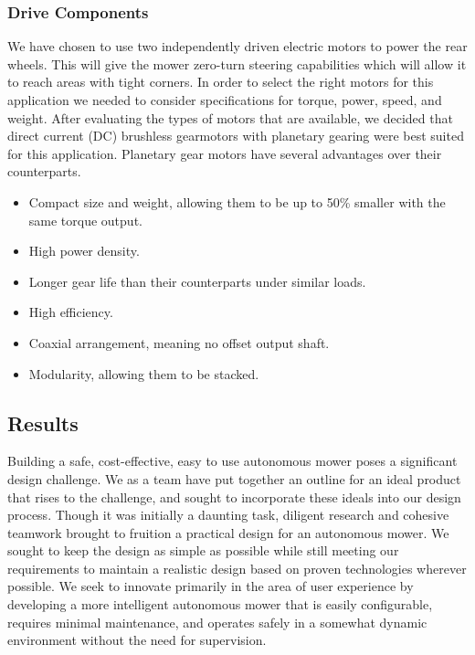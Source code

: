 \documentclass[12pt,letterpaper]{article}
\begin{document}
\subsubsection{Drive Components}

We have chosen to use two independently driven electric motors to power the rear
wheels.  This will give the mower zero-turn steering capabilities which will
allow it to reach areas with tight corners.  In order to select the right motors
for this application we needed to consider specifications for torque, power,
speed, and weight.  After evaluating the types of motors that are available, we
decided that direct current (DC) brushless gearmotors with planetary gearing
were best suited for this application.  Planetary gear motors have several
advantages over their counterparts.
\begin{singlespace}
\begin{itemize}
  \item Compact size and weight, allowing them to be up to 50\% smaller with the
  same torque output.
  \item High power density.
  \item Longer gear life than their counterparts under similar loads.
  \item High efficiency.
  \item Coaxial arrangement, meaning no offset output shaft.
  \item Modularity, allowing them to be stacked.
\end{itemize}
\end{singlespace}






\subsection{Results}


Building a safe, cost-effective, easy to use autonomous mower poses a
significant design challenge.  We as a team have put together an outline for an
ideal product that rises to the challenge, and sought to incorporate these
ideals into our design process.  Though it was initially a daunting task,
diligent research and cohesive teamwork brought to fruition a practical design
for an autonomous mower.  We sought to keep the design as simple as possible
while still meeting our requirements to maintain a realistic design based on
proven technologies wherever possible.  We seek to innovate primarily in the
area of user experience by developing a more intelligent autonomous mower that
is easily configurable, requires minimal maintenance, and operates safely in a
somewhat dynamic environment without the need for supervision.
\end{document}
